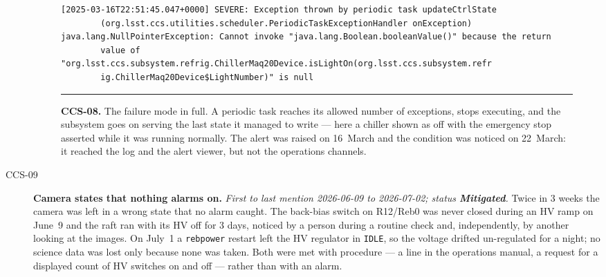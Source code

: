 \begin{description}
\begin{figure}[H]
\begin{minipage}{\textwidth}
\begin{verbatim}
[2025-03-16T22:51:45.047+0000] SEVERE: Exception thrown by periodic task updateCtrlState
        (org.lsst.ccs.utilities.scheduler.PeriodicTaskExceptionHandler onException)
java.lang.NullPointerException: Cannot invoke "java.lang.Boolean.booleanValue()" because the return
        value of "org.lsst.ccs.subsystem.refrig.ChillerMaq20Device.isLightOn(org.lsst.ccs.subsystem.refr
        ig.ChillerMaq20Device$LightNumber)" is null
\end{verbatim}
\endgroup
\vspace{-10pt}\hrule
\end{minipage}
\caption{\textbf{CCS-08.} The failure mode in full.  A periodic task reaches its allowed number of exceptions, stops executing, and the subsystem goes on serving the last state it managed to write --- here a chiller shown as off with the emergency stop asserted while it was running normally.  The alert was raised on 16~March and the condition was noticed on 22~March: it reached the log and the alert viewer, but not the operations channels.}
\label{fig:iss-CCS-08}
\end{figure}

\item[CCS-09]\label{iss:CCS-09} \textbf{Camera states that nothing alarms on.}
  \emph{First to last mention 2026-06-09 to 2026-07-02; status \textcolor{stmit}{\textbf{Mitigated}}.}
  Twice in 3 weeks the camera was left in a wrong state that no alarm caught.  The back-bias switch on R12/Reb0 was never closed during an HV ramp on June~9 and the raft ran with its HV off for 3 days, noticed by a person during a routine check and, independently, by another looking at the images.  On July~1 a \texttt{rebpower} restart left the HV regulator in \texttt{IDLE}, so the voltage drifted un-regulated for a night; no science data was lost only because none was taken.  Both were met with procedure --- a line in the operations manual, a request for a displayed count of HV switches on and off --- rather than with an alarm.

\end{description}

